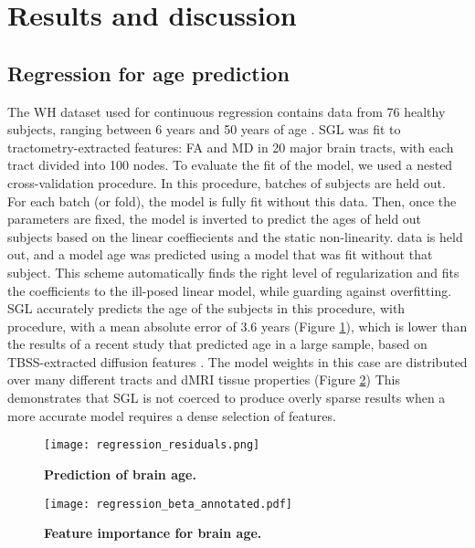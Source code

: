 \section*{Results and discussion}

\subsection*{Regression for age prediction}

The WH dataset used for continuous regression contains data from 76 healthy
subjects, ranging between 6 years and 50 years of age
\cite{yeatman2014lifespan}. SGL was fit to tractometry-extracted features: FA
and MD in 20 major brain tracts, with each tract divided into 100 nodes. To
evaluate the fit of the model, we used a nested cross-validation procedure. In
this procedure, batches of subjects are held out. For each batch (or fold), the
model is fully fit without this data. Then, once the parameters are fixed, the
model is inverted to predict the ages of held out subjects based on the linear
coeffiecients and the static non-linearity. data is held out, and a model age
was predicted using a model that was fit without that subject. This scheme
automatically finds the right level of regularization and fits the coefficients
to the ill-posed linear model, while guarding against overfitting. SGL
accurately predicts the age of the subjects in this procedure, with procedure,
with a mean absolute error of 3.6 years (Figure \ref{fig:regress-results}),
which is lower than the results of a recent study that predicted age in a large
sample, based on TBSS-extracted diffusion features \cite{Richard2018-ux}. The
model weights in this case are distributed over many different tracts and dMRI
tissue properties (Figure \ref{fig:regress-beta}) This demonstrates that SGL is
not coerced to produce overly sparse results when a more accurate model requires
a dense selection of features.


\begin{figure}[!h]
    \centering
    \texttt{[image: regression\_residuals.png]}
    \caption{{\bf Prediction of brain age.}
    }
    \label{fig:regress-results}
\end{figure}

\begin{figure}[!h]
    \centering
    \texttt{[image: regression\_beta\_annotated.pdf]}
    \caption{{\bf Feature importance for brain age.}
    }
    \label{fig:regress-beta}
\end{figure}


